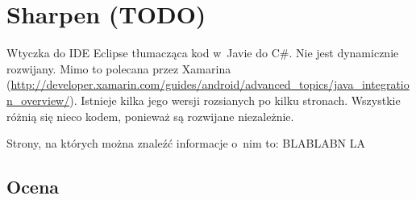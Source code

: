 \section{Sharpen (TODO)}
Wtyczka do IDE Eclipse tłumacząca kod w~Javie do C\#.
Nie jest dynamicznie rozwijany. Mimo to polecana przez Xamarina (\url{http://developer.xamarin.com/guides/android/advanced_topics/java_integration_overview/}).
Istnieje kilka jego wersji rozsianych po kilku stronach. Wszystkie różnią się nieco kodem, ponieważ są rozwijane niezależnie.

Strony, na których można znaleźć informacje o~nim to: BLABLABN LA

\subsection{Ocena}

